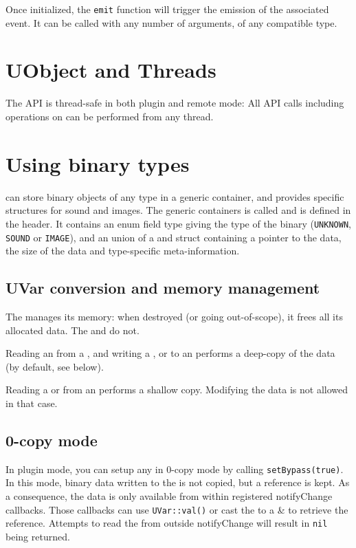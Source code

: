 Once initialized, the \lstinline{emit} function will trigger the emission of
the associated \us event. It can be called with any number of arguments, of
any compatible type.

\section{UObject and Threads}

The \UObject API is thread-safe in both plugin and remote mode: All API
calls including operations on \UVar can be performed from any thread.

\section{Using binary types}

\urbi can store binary objects of any type in a generic container, and
provides specific structures for sound and images. The generic containers is
called \UBinary and is defined in the  header. It
contains an enum field type giving the type of the binary
(\lstinline{UNKNOWN}, \lstinline{SOUND} or \lstinline{IMAGE}), and an union
of a \USound and \UImage struct containing a pointer to the data, the size
of the data and type-specific meta-information.

\subsection{UVar conversion and memory management}
The \UBinary manages its memory: when destroyed (or going out-of-scope), it
frees all its allocated data. The \USound and \UImage do not.

Reading an \UBinary from a \UVar, and writing a \UBinary, \USound or \UImage
to an \UVar performs a deep-copy of the data (by default, see below).

Reading a \USound or \UImage from an \UVar performs a shallow
copy. Modifying the data is not allowed in that case.

\subsection{0-copy mode}
In plugin mode, you can setup any \UVar in 0-copy mode by calling
\lstinline{setBypass(true)}. In this mode, binary data written to the \UVar
is not copied, but a reference is kept.  As a consequence, the data is only
available from within registered notifyChange callbacks. Those callbacks can
use \lstinline|UVar::val()| or cast the \UVar to a \UBinary\& to retrieve
the reference.  Attempts to read the \UVar from outside notifyChange will
result in \lstinline{nil} being returned.

